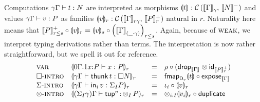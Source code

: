 \documentclass[acmsmall,review,anonymous]{acmart}\settopmatter{printfolios=true,printccs=false,printacmref=false}
\theoremstyle{remark}
\begin{document}
Computations $\gamma\Gamma \vdash t : N$ are interpreted as morphisms
$\llparenthesis t\rrparenthesis : \mathcal{C}\,(\llbracket\Gamma\rrbracket^{}_{\gamma},\,\llbracket N\rrbracket^{-})$ and values
$\gamma\Gamma \vdash v : P$ as families
$\llparenthesis v\rrparenthesis_{r} : \mathcal{C}\,(\llbracket\Gamma\rrbracket^{}_{r\gamma},\,\llbracket P\rrbracket^{+}_{r})$ natural in $r$.
Naturality here means that
$\llbracket P\rrbracket^{+}_{r \leq s} \circ \llparenthesis v\rrparenthesis_{r} = \llparenthesis v\rrparenthesis_{s} \circ \left(\llbracket\Gamma\rrbracket^{}_{(\_
    \cdot \gamma)}\right)_{r \leq s}$.
Again, because of $\mbox{\textsc{weak}}$, we interpret typing derivations rather than terms.
The interpretation is now rather straightforward, but we spell it out for reference.
\[
\begin{array}{llcl}
\rvar %
  & \denv {\ValTy{\qext 0 \Gamma 1 x P} x P} r
  & = & \Gr \comp (\tdrop[\den\Gamma] \otimes \tid[\Denp P r])
\\
\rintro\Box
  & \denv {\qValTy \gamma \Gamma {\thunk t} {\Box N}} r
  & = & \fmapt[{\D[r]}]{\dent t} \comp \expose[\den \Gamma]
\\
\rintro\GS
  & \denv{\qValTy \gamma \Gamma {\inj i v} {\sumt I P}} r
  & = & \iota_i \comp \denv v r
\\
\rintro\otimes
  & \denv{\pValTy {\sumt I \gamma} \Gamma {\tup v} {\tupt I P}} r
  & = & \tupt {i:I} \denv {v_i}r \comp \duplicate
\\
\end{array}
\]
\end{document}
